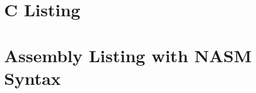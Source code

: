 \documentclass[12pt, a4paper]{article}
\begin{document}
\section{C Listing}



\section{Assembly Listing with NASM Syntax}


\end{document}
